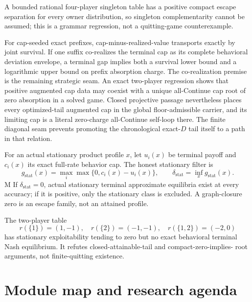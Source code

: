 \documentclass[11pt]{article}
\newcommand{\MTag}{\textsf{M}}
\newcommand{\Audit}{\MTag}
\newcommand{\Status}[1]{#1}
\begin{document}
A bounded rational
four-player singleton table has a positive compact escape separation for every
owner distribution, so singleton complementarity cannot be assumed; this is a
grammar regression, not a quitting-game counterexample.

For cap-seeded exact prefixes, cap-minus-realized-value transports exactly by
joint survival.  If one suffix co-realizes the terminal cap as its complete
behavioral deviation envelope, a terminal gap implies both a survival lower
bound and a logarithmic upper bound on prefix absorption charge.  The
co-realization premise is the remaining strategic seam.  An exact two-player
regression shows that positive augmented cap data may coexist with a unique
all-Continue cap root of zero absorption in a solved game.
Closed projective passage nevertheless places every optimized-tail augmented
cap in the global floor-admissible carrier, and its limiting cap is a literal
zero-charge all-Continue self-loop there.  The finite diagonal seam prevents
promoting the chronological exact-$D$ tail itself to a path in that relation.

For an actual stationary product profile \(x\), let \(u_i(x)\) be terminal
payoff and \(c_i(x)\) its exact full-rate behavior cap.  The honest stationary
filter is
\[
 g_{\mathrm{stat}}(x)=\max_i\max\{0,c_i(x)-u_i(x)\},\qquad
 \delta_{\mathrm{stat}}=\inf_x g_{\mathrm{stat}}(x).
\tag{26}
\]
\Status{\Audit} If \(\delta_{\mathrm{stat}}=0\), actual stationary terminal
approximate equilibria exist at every accuracy; if it is positive, only the
stationary class is excluded.  A graph-closure zero is an escape family, not
an attained profile.

The two-player table
\[
 r(\{1\})=(1,-1),\quad r(\{2\})=(-1,-1),\quad r(\{1,2\})=(-2,0)
\tag{27}
\]
has stationary exploitability tending to zero but no exact behavioral terminal
Nash equilibrium.  It refutes closed-attainable-tail and compact-zero-implies-
root arguments, not finite-quitting existence.

\section{Module map and research agenda}
\end{document}
